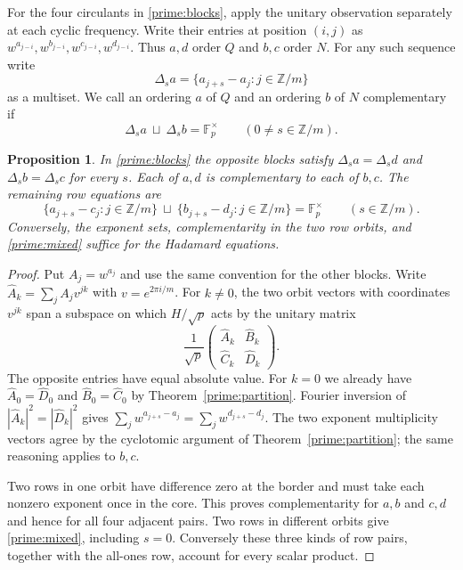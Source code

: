 \documentclass[11pt,a4paper]{article}
\newtheorem{proposition}[theorem]{Proposition}
\numberwithin{equation}{section}
\begin{document}
For the four circulants in \eqref{prime:blocks}, apply the unitary observation separately at each cyclic frequency. Write their entries at position $(i,j)$ as $w^{a_{j-i}},w^{b_{j-i}},w^{c_{j-i}},w^{d_{j-i}}$. Thus $a,d$ order $Q$ and $b,c$ order $N$. For any such sequence write
$$\Delta_s a=\{a_{j+s}-a_j:j\in\mathbb Z/m\}$$
as a multiset. We call an ordering $a$ of $Q$ and an ordering $b$ of $N$ complementary if
\begin{equation}\label{eq:complement}
\Delta_s a\ \sqcup\ \Delta_s b=\mathbb F_p^\times\qquad(0\ne s\in\mathbb Z/m).
\end{equation}

\begin{proposition}\label{prime:opposites}
In \eqref{prime:blocks} the opposite blocks satisfy $\Delta_s a=\Delta_s d$ and $\Delta_s b=\Delta_s c$ for every $s$. Each of $a,d$ is complementary to each of $b,c$. The remaining row equations are
\begin{equation}\label{prime:mixed}
\{a_{j+s}-c_j:j\in\mathbb Z/m\}\ \sqcup\
\{b_{j+s}-d_j:j\in\mathbb Z/m\}=\mathbb F_p^\times
\qquad(s\in\mathbb Z/m).
\end{equation}
Conversely, the exponent sets, complementarity in the two row orbits, and \eqref{prime:mixed} suffice for the Hadamard equations.
\end{proposition}
\begin{proof}
Put $A_j=w^{a_j}$ and use the same convention for the other blocks. Write $\widehat A_k=\sum_j A_j v^{jk}$ with $v=e^{2\pi i/m}$. For $k\ne0$, the two orbit vectors with coordinates $v^{jk}$ span a subspace on which $H/\sqrt p$ acts by the unitary matrix
$$\frac1{\sqrt p}\begin{pmatrix}\widehat A_k&\widehat B_k\\ \widehat C_k&\widehat D_k\end{pmatrix}.$$
The opposite entries have equal absolute value. For $k=0$ we already have $\widehat A_0=\widehat D_0$ and $\widehat B_0=\widehat C_0$ by Theorem~\ref{prime:partition}. Fourier inversion of $|\widehat A_k|^2=|\widehat D_k|^2$ gives $\sum_j w^{a_{j+s}-a_j}=\sum_j w^{d_{j+s}-d_j}$. The two exponent multiplicity vectors agree by the cyclotomic argument of Theorem~\ref{prime:partition}; the same reasoning applies to $b,c$.

Two rows in one orbit have difference zero at the border and must take each nonzero exponent once in the core. This proves complementarity for $a,b$ and $c,d$ and hence for all four adjacent pairs. Two rows in different orbits give \eqref{prime:mixed}, including $s=0$. Conversely these three kinds of row pairs, together with the all-ones row, account for every scalar product.
\end{proof}
\end{document}
